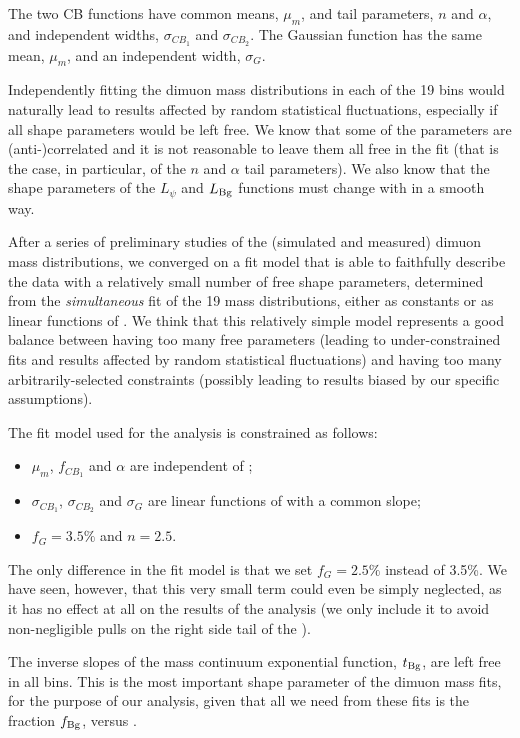 The two CB functions have common means, $\mu_m$, and tail parameters, $n$ and $\alpha$,
and independent widths, $\sigma_{CB_1}$ and $\sigma_{CB_2}$.
The Gaussian function has the same mean, $\mu_m$, 
and an independent width, $\sigma_{G}$.

Independently fitting the dimuon mass distributions in each of the 19 \pt bins 
would naturally lead to results affected by random statistical fluctuations,
especially if all shape parameters would be left free.
We know that some of the parameters are (anti-)correlated and it is not reasonable 
to leave them all free in the fit 
(that is the case, in particular, of the $n$ and $\alpha$ tail parameters).
We also know that the shape parameters of the $L_{\psi}$ and $L_{\rm Bg}$ functions
must change with \pt in a smooth way.

After a series of preliminary studies of the (simulated and measured) dimuon mass distributions,
we converged on a fit model that is able to faithfully describe the data 
with a relatively small number of free shape parameters,
determined from the \emph{simultaneous} fit of the 19 mass distributions,
either as constants or as linear functions of \pt.
We think that this relatively simple model represents a good balance 
between having too many free parameters 
(leading to under-constrained fits and results affected by random statistical fluctuations)
and having too many arbitrarily-selected constraints
(possibly leading to results biased by our specific assumptions).

\vfill\newpage

The fit model used for the \jpsi analysis is constrained as follows:
\begin{itemize}
\item $\mu_m$, $f_{CB_1}$ and $\alpha$ are independent of \pt;
\item $\sigma_{CB_1}$, $\sigma_{CB_2}$ and $\sigma_{G}$ 
are linear functions of \pt with a common slope;
\item $f_G = 3.5\%$ and $n = 2.5$.
\end{itemize}

The only difference in the \psip fit model is that we set $f_G = 2.5\%$
instead of 3.5\%. We have seen, however, that this very small term could even 
be simply neglected, as it has no effect at all on the results of the analysis
(we only include it to avoid non-negligible pulls on the right side tail of the \jpsi).

The inverse slopes of the mass continuum exponential function, $t_{\rm Bg}$,
are left free in all \pt bins. 
This is the most important shape parameter of the dimuon mass fits,
for the purpose of our analysis, given that all we need from these fits is
the fraction $f_{\rm Bg}$, versus \pt.

